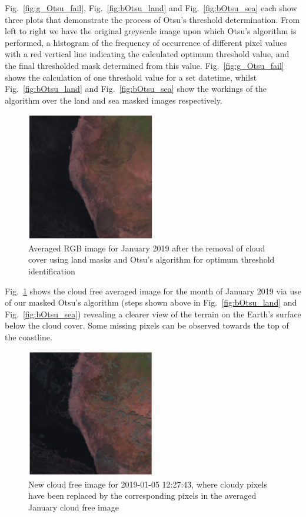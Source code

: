 Fig.~\ref{fig:g_Otsu_fail}, Fig.~\ref{fig:bOtsu_land} and Fig.~\ref{fig:bOtsu_sea} each show three plots that demonstrate the process of Otsu's threshold determination. From left to right we have the original greyscale image upon which Otsu's algorithm is performed, a histogram of the frequency of occurrence of different pixel values with a red vertical line indicating the calculated optimum threshold value, and the final thresholded mask determined from this value. Fig.~\ref{fig:g_Otsu_fail} shows the calculation of one threshold value for a set datetime, whilst Fig.~\ref{fig:bOtsu_land} and Fig.~\ref{fig:bOtsu_sea} show the workings of the algorithm over the land and sea masked images respectively.\\

\begin{figure}[hbt!]
    \centering
    \includegraphics[width=0.5\textwidth]{Otsu_av_mon.png}
    \caption{Averaged RGB image for January 2019 after the removal of cloud cover using land masks and Otsu's algorithm for optimum threshold identification}
    \label{fig:av_Otsu}
\end{figure}


Fig.~\ref{fig:av_Otsu} shows the cloud free averaged image for the month of January 2019 via use of our masked Otsu's algorithm (steps shown above in Fig.~\ref{fig:bOtsu_land} and Fig.~\ref{fig:bOtsu_sea}) revealing a clearer view of the terrain on the Earth's surface below the cloud cover. Some missing pixels can be observed towards the top of the coastline.\\

\begin{figure}[h]
    \centering
    \includegraphics[width=0.5\textwidth]{Otsu_filled_2019-01-05 122743.png}
    \caption{New cloud free image for 2019-01-05 12:27:43, where cloudy pixels have been replaced by the corresponding pixels in the averaged January cloud free image}
    \label{fig:Otsu_fill}
\end{figure}

